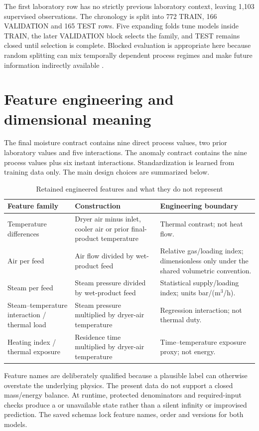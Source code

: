 The first laboratory row has no strictly previous laboratory context, leaving 1,103 supervised observations. The chronology is split into 772 TRAIN, 166 VALIDATION and 165 TEST rows. Five expanding folds tune models inside TRAIN, the later VALIDATION block selects the family, and TEST remains closed until selection is complete. Blocked evaluation is appropriate here because random splitting can mix temporally dependent process regimes and make future information indirectly available \cite{bergmeir2012}.

\section{Feature engineering and dimensional meaning}

The final moisture contract contains nine direct process values, two prior laboratory values and five interactions. The anomaly contract contains the nine process values plus six instant interactions. Standardization is learned from training data only. The main design choices are summarized below.

\begin{table}[htbp]
\centering\small
\caption{Retained engineered features and what they do not represent}
\label{tab:engineered-summary}
\begin{tabularx}{\textwidth}{@{}p{}p{}Y@{}}
\toprule
Feature family & Construction & Engineering boundary \\
\midrule
Temperature differences & Dryer air minus inlet, cooler air or prior final-product temperature & Thermal contrast; not heat flow. \\
Air per feed & Air flow divided by wet-product feed & Relative gas/loading index; dimensionless only under the shared volumetric convention. \\
Steam per feed & Steam pressure divided by wet-product feed & Statistical supply/loading index; units bar/(m$^3$/h). \\
Steam--temperature interaction / thermal load & Steam pressure multiplied by dryer-air temperature & Regression interaction; not thermal duty. \\
Heating index / thermal exposure & Residence time multiplied by dryer-air temperature & Time--temperature exposure proxy; not energy. \\
\bottomrule
\end{tabularx}
\end{table}

Feature names are deliberately qualified because a plausible label can otherwise overstate the underlying physics. The present data do not support a closed mass/energy balance. At runtime, protected denominators and required-input checks produce a  or unavailable state rather than a silent infinity or improvised prediction. The saved schemas lock feature names, order and versions for both models.

